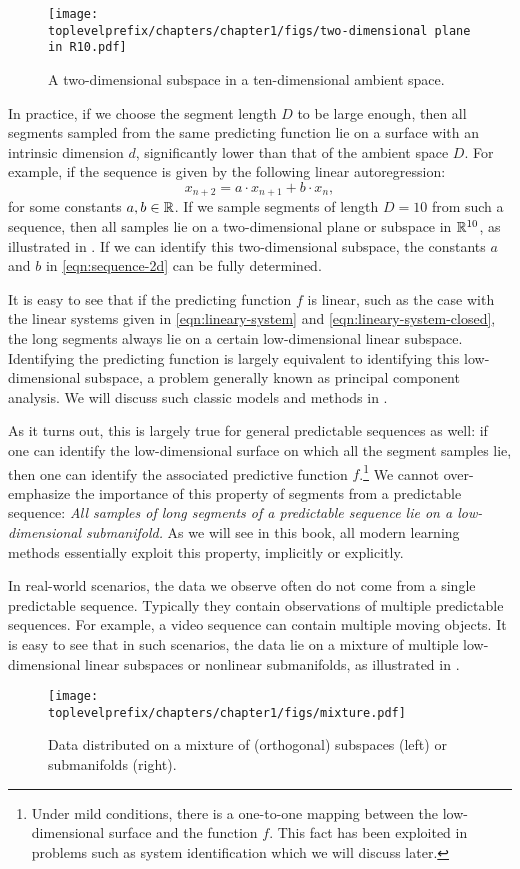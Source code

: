 \documentclass[../../book-main.tex]{subfiles}
\begin{document}
\begin{figure}[t]
\centering
\texttt{[image: \\toplevelprefix/chapters/chapter1/figs/two-dimensional plane in R10.pdf]}
    \caption{A two-dimensional subspace in a ten-dimensional ambient space.}
    \label{fig:lowdimplane}
\end{figure}
In practice, if we choose the segment length $D$ to be large enough, then all segments sampled from the same predicting function lie on a surface with an intrinsic dimension $d$, significantly lower than that of the ambient space $D$. For example, if the sequence is given by the following linear autoregression:
\begin{equation}
    x_{n+2} = a\cdot x_{n+1} + b\cdot x_n,
    \label{eqn:sequence-2d}
\end{equation}
for some constants $a, b \in \mathbb{R}$. If we sample segments of length $D =10$ from such a sequence, then all samples lie on a two-dimensional plane or subspace in $\mathbb{R}^{10}$, as illustrated in . If we can identify this two-dimensional subspace, the constants $a$ and $b$ in \eqref{eqn:sequence-2d} can be fully determined. 


It is easy to see that if the predicting function $f$ is linear, such as the case with the linear systems given in \eqref{eqn:lineary-system} and \eqref{eqn:lineary-system-closed}, the long segments always lie on a certain low-dimensional linear subspace. Identifying the predicting function is largely equivalent to identifying this low-dimensional subspace, a problem generally known as principal component analysis. We will discuss such classic models and methods in .

As it turns out, this is largely true for general predictable sequences as well: if one can identify the low-dimensional surface on which all the segment samples lie, then one can identify the associated predictive function $f$.\footnote{Under mild conditions, there is a one-to-one mapping between the low-dimensional surface and the function $f$. This fact has been exploited in problems such as system identification which we will discuss later.} We cannot over-emphasize the importance of this property of segments from a predictable sequence: {\em All samples of long segments of a predictable sequence lie on a low-dimensional submanifold.} As we will see in this book, all modern learning methods essentially exploit this property, implicitly or explicitly. %

In real-world scenarios, the data we observe often do not come from a single predictable sequence. Typically they contain observations of multiple predictable sequences. For example, a video sequence can contain multiple moving objects. It is easy to see that in such scenarios, the data lie on a mixture of multiple low-dimensional linear subspaces or nonlinear submanifolds, as illustrated in . 
\begin{figure}
    \centering
    \texttt{[image: \\toplevelprefix/chapters/chapter1/figs/mixture.pdf]}
    \caption{Data distributed on a mixture of (orthogonal) subspaces (left) or submanifolds (right).}
    \label{fig:mixture-models}
\end{figure}
\end{document}
